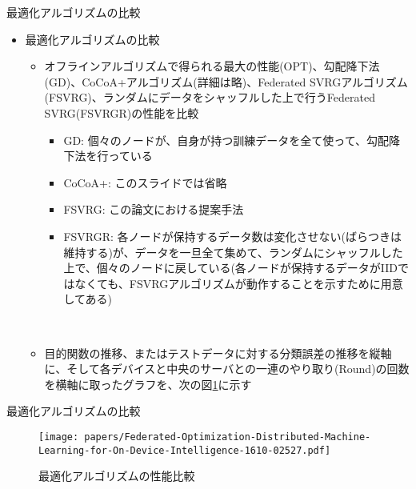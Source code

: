 \documentclass[dvipdfmx,notheorems,t]{beamer}
\begin{document}
\begin{frame}{最適化アルゴリズムの比較}

\begin{itemize}
	\item 最適化アルゴリズムの比較
	\begin{itemize}		
		\item オフラインアルゴリズムで得られる最大の性能(OPT)、勾配降下法(GD)、CoCoA+アルゴリズム(詳細は略)、Federated SVRGアルゴリズム(FSVRG)、ランダムにデータをシャッフルした上で行うFederated SVRG(FSVRGR)の性能を比較
		\begin{itemize}
			\item GD: 個々のノードが、自身が持つ訓練データを全て使って、勾配降下法を行っている
			\item CoCoA+: このスライドでは省略
			\item FSVRG: この論文における提案手法
			\item FSVRGR: 各ノードが保持するデータ数は変化させない(ばらつきは維持する)が、データを一旦全て集めて、ランダムにシャッフルした上で、個々のノードに戻している(各ノードが保持するデータがIIDではなくても、FSVRGアルゴリズムが動作することを示すために用意してある)
		\end{itemize} \
		
		\item 目的関数の推移、またはテストデータに対する分類誤差の推移を縦軸に、そして各デバイスと中央のサーバとの一連のやり取り(Round)の回数を横軸に取ったグラフを、次の図\ref{fig:algorithm-comparison}に示す
	\end{itemize}
\end{itemize}

\end{frame}

\begin{frame}{最適化アルゴリズムの比較}

\begin{figure}
	\centering
	\texttt{[image: papers/Federated-Optimization-Distributed-Machine-Learning-for-On-Device-Intelligence-1610-02527.pdf]}
	\caption{最適化アルゴリズムの性能比較~\cite{1610.02527}}
	\label{fig:algorithm-comparison}
\end{figure}

\end{frame}
\end{document}
